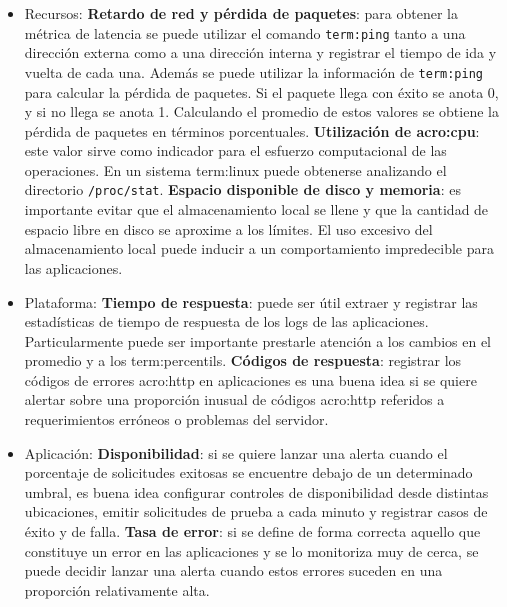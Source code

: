 \begin{itemize}
  \item Recursos:
    \subitem \textbf{Retardo de red y pérdida de paquetes}: para obtener la
    métrica de latencia se puede utilizar el comando \texttt{\gls{term:ping}}
    tanto a una dirección externa como a una dirección interna y registrar el
    tiempo de ida y vuelta de cada una. Además se puede utilizar la información
    de \texttt{\gls{term:ping}} para calcular la pérdida de paquetes.  Si el
    paquete llega con éxito se anota 0, y si no llega se anota 1. Calculando el
    promedio de estos valores se obtiene la pérdida de paquetes en términos
    porcentuales.
    \subitem \textbf{Utilización de \gls{acro:cpu}}: este valor sirve como
    indicador para el esfuerzo computacional de las operaciones. En un sistema
    \gls{term:linux} puede obtenerse analizando el directorio
    \texttt{/proc/stat}.
    \subitem \textbf{Espacio disponible de disco y memoria}: es importante
    evitar que el almacenamiento local se llene y que la cantidad de espacio
    libre en disco se aproxime a los límites. El uso excesivo del
    almacenamiento local puede inducir a un comportamiento impredecible para
    las aplicaciones.

  \item Plataforma:
    \subitem \textbf{Tiempo de respuesta}: puede ser útil extraer y registrar
    las estadísticas de tiempo de respuesta de los logs de las aplicaciones.
    Particularmente puede ser importante prestarle atención a los cambios en el
    promedio y a los \glspl{term:percentil}.
    \subitem \textbf{Códigos de respuesta}: registrar los códigos de errores
    \gls{acro:http} en aplicaciones  es una buena idea si se
    quiere alertar sobre una proporción inusual de códigos \gls{acro:http}
    referidos a requerimientos erróneos o problemas del servidor.

  \item Aplicación:
    \subitem \textbf{Disponibilidad}: si se quiere lanzar una alerta cuando el
    porcentaje de solicitudes exitosas se encuentre debajo de un determinado
    umbral, es buena idea configurar controles de disponibilidad desde
    distintas ubicaciones, emitir solicitudes de prueba a cada minuto y
    registrar casos de éxito y de falla.
    \subitem \textbf{Tasa de error}: si se define de forma correcta aquello que
    constituye un error en las aplicaciones y se lo monitoriza muy de cerca, se
    puede decidir lanzar una alerta cuando estos errores suceden en una
    proporción relativamente alta.

\end{itemize}

